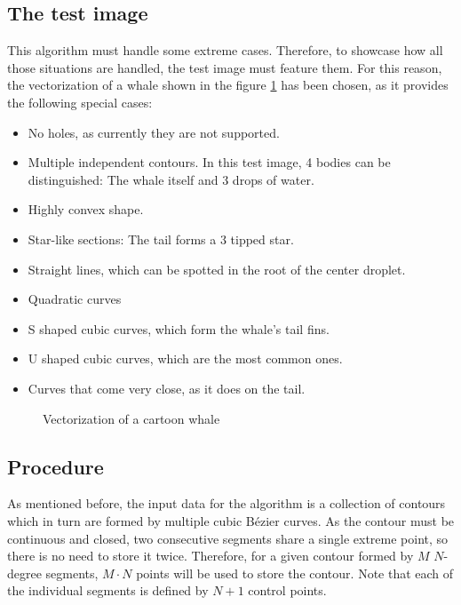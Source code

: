 \documentclass[\topdir/main.tex]{subfiles}
\begin{document}
\subsection{The test image}
This algorithm must handle some extreme cases. Therefore, to showcase how all those situations are handled, the test image must feature them. For this reason, the vectorization of a whale shown in the figure \ref{fig:whale} has been chosen, as it provides the following special cases:

\begin{itemize}
    \item No holes, as currently they are not supported.
    \item Multiple independent contours. In this test image, 4 bodies can be distinguished: The whale itself and 3 drops of water.
    \item Highly convex shape.
    \item Star-like sections: The tail forms a 3 tipped star.
    \item Straight lines, which can be spotted in the root of the center droplet.
    \item Quadratic curves
    \item S shaped cubic curves, which form the whale's tail fins.
    \item U shaped cubic curves, which are the most common ones.
    \item Curves that come very close, as it does on the tail.
\end{itemize}

\begin{figure}[hbtp]
    \centering

    \caption{Vectorization of a cartoon whale}
    \label{fig:whale}
\end{figure}

\subsection{Procedure}
As mentioned before, the input data for the algorithm is a collection of contours which in turn are formed by multiple cubic Bézier curves. As the contour must be continuous and closed, two consecutive segments share a single extreme point, so there is no need to store it twice. Therefore, for a given contour formed by $M$ $N$-degree segments, $M \cdot N$ points will be used to store the contour. Note that each of the individual segments is defined by $N+1$ control points.\newline 
\end{document}
